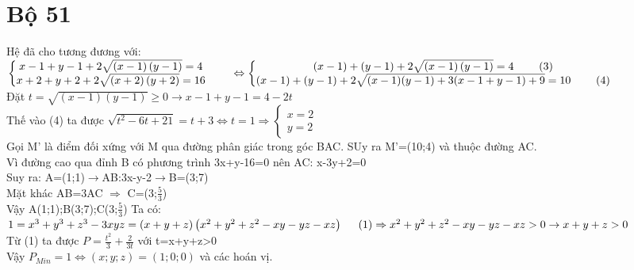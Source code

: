 \section{Bộ 51}
\hda 
Hệ đã cho tương đương với: $\left\{\begin{matrix}
x-1+y-1+2\sqrt{\left ( x-1 \right )\left ( y-1 \right )}=4&  & \\ 
x+2+y+2+2\sqrt{\left ( x+2 \right )\left ( y+2 \right )}=16 &  & 
\end{matrix}\right.\\
\Leftrightarrow \left\{\begin{matrix}
(x-1)+(y-1)+2\sqrt{\left ( x-1 \right )\left ( y-1 \right )}=4\hspace{8mm}(3) &  & \\ 
\left ( x-1 \right )+(y-1)+2\sqrt{(x-1)(y-1)+3(x-1+y-1)+9}=10\hspace{8mm}(4) &  & 
\end{matrix}\right.$\\
Đặt $t=\sqrt{(x-1)(y-1)}\geq 0\rightarrow x-1+y-1=4-2t$\\
Thế vào (4) ta được $\sqrt{t^{2}-6t+21}=t+3\Leftrightarrow t=1\Rightarrow \left\{\begin{matrix}
x=2 &  & \\ 
y=2 &  & 
\end{matrix}\right.$\\
\hda 
Gọi M' là điểm đối xứng với M qua đường phân giác trong góc BAC. SUy ra M'=(10;4) và thuộc đường AC.\\
Vì đường cao qua đỉnh B có phương trình 3x+y-16=0 nên AC: x-3y+2=0\\
Suy ra: A=(1;1)$\rightarrow$AB:3x-y-2$\rightarrow$B=(3;7)\\
Mặt khác AB=3AC $\Rightarrow$ C=(3;$\frac{5}{3}$)\\
Vậy A(1;1);B(3;7);C(3;$\frac{5}{3}$)
\hda 
Ta có: $1=x^{3}+y^{3}+z^{3}-3xyz=\left ( x+y+z \right )\left ( x^{2}+y^{2}+z^{2}-xy-yz-xz \right )\hspace{5mm}(1)\\
\Rightarrow x^{2}+y^{2}+z^{2}-xy-yz-xz> 0\rightarrow x+y+z> 0$\\
Từ (1) ta được $P=\frac{t^{2}}{3}+\frac{2}{3t}$ với t=x+y+z>0\\
Vậy $P_{Min}=1\Leftrightarrow \left ( x;y;z \right )=(1;0;0)$ và các hoán vị.
